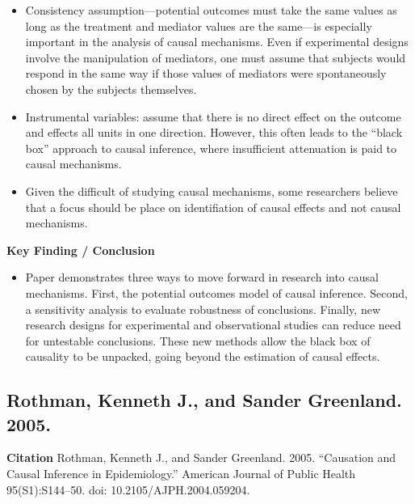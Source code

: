 \documentclass[
]{book}
\providecommand{\tightlist}{%
  \setlength{\itemsep}{0pt}\setlength{\parskip}{0pt}}
\begin{document}
\begin{itemize}
\tightlist
\item
  Consistency assumption---potential outcomes must take the same values as long as the treatment and mediator values are the same---is especially important in the analysis of causal mechanisms. Even if experimental designs involve the manipulation of mediators, one must assume that subjects would respond in the same way if those values of mediators were spontaneously chosen by the subjects themselves.
\item
  Instrumental variables: assume that there is no direct effect on the outcome and effects all units in one direction. However, this often leads to the ``black box'' approach to causal inference, where insufficient attenuation is paid to causal mechanisms.\\
\item
  Given the difficult of studying causal mechanisms, some researchers believe that a focus should be place on identifiation of causal effects and not causal mechanisms.
\end{itemize}

\textbf{Key Finding / Conclusion}

\begin{itemize}
\tightlist
\item
  Paper demonstrates three ways to move forward in research into causal mechanisms. First, the potential outcomes model of causal inference. Second, a sensitivity analysis to evaluate robustness of conclusions. Finally, new research designs for experimental and observational studies can reduce need for untestable conclusions. These new methods allow the black box of causality to be unpacked, going beyond the estimation of causal effects.
\end{itemize}

\hypertarget{rothman-kenneth-j.-and-sander-greenland.-2005.}{%
\subsection*{Rothman, Kenneth J., and Sander Greenland. 2005.}\label{rothman-kenneth-j.-and-sander-greenland.-2005.}}

\textbf{Citation}
Rothman, Kenneth J., and Sander Greenland. 2005. ``Causation and Causal Inference in Epidemiology.'' American Journal of Public Health 95(S1):S144--50. doi: 10.2105/AJPH.2004.059204.
\end{document}
